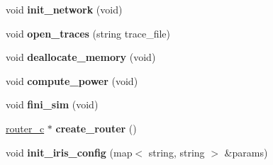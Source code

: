 \begin{DoxyCompactItemize}
\item 
\hypertarget{classmacsim__c_aa51f0db3aa3947724c61f738c26eae79}{
void {\bfseries init\_\-network} (void)}
\label{classmacsim__c_aa51f0db3aa3947724c61f738c26eae79}

\item 
\hypertarget{classmacsim__c_aa6de0832c788be63cf7b6d73c3f0ec34}{
void {\bfseries open\_\-traces} (string trace\_\-file)}
\label{classmacsim__c_aa6de0832c788be63cf7b6d73c3f0ec34}

\item 
\hypertarget{classmacsim__c_a63571fad11e1f3ba698696c5ceddb7f2}{
void {\bfseries deallocate\_\-memory} (void)}
\label{classmacsim__c_a63571fad11e1f3ba698696c5ceddb7f2}

\item 
\hypertarget{classmacsim__c_ac80797445768f61baccbaa02a5221c31}{
void {\bfseries compute\_\-power} (void)}
\label{classmacsim__c_ac80797445768f61baccbaa02a5221c31}

\item 
\hypertarget{classmacsim__c_ab28a994ee52094fb8fae763115704966}{
void {\bfseries fini\_\-sim} (void)}
\label{classmacsim__c_ab28a994ee52094fb8fae763115704966}

\item 
\hypertarget{classmacsim__c_af737aef1a3b6dc3ae2d1f40556258d0d}{
\hyperlink{classrouter__c}{router\_\-c} $\ast$ {\bfseries create\_\-router} ()}
\label{classmacsim__c_af737aef1a3b6dc3ae2d1f40556258d0d}

\item 
\hypertarget{classmacsim__c_a9e5c1c68fac3d4448791ca601c19739a}{
void {\bfseries init\_\-iris\_\-config} (map$<$ string, string $>$ \&params)}
\label{classmacsim__c_a9e5c1c68fac3d4448791ca601c19739a}

\end{DoxyCompactItemize}
